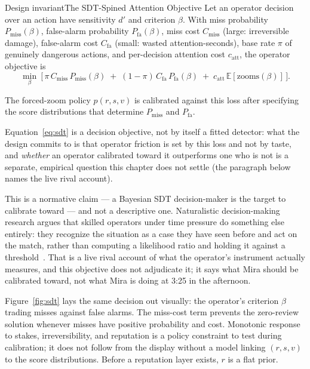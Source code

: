 \documentclass[11pt,a4paper]{article}
\theoremstyle{definition}
\theoremstyle{plain}
\begin{document}
\begin{pdclaim}{Design invariant}{The SDT-Spined Attention Objective}
\setlength{\parskip}{4pt plus 1pt}
\label{def:sdt}
Let an operator decision over an action have sensitivity $d'$ and criterion $\beta$.
With miss probability $P_{\text{miss}}(\beta)$, false-alarm probability
$P_{\text{fa}}(\beta)$, miss cost $C_{\text{miss}}$ (large: irreversible damage),
false-alarm cost $C_{\text{fa}}$ (small: wasted attention-seconds), base rate $\pi$
of genuinely dangerous actions, and per-decision attention cost $c_{\mathrm{att}}$, the operator
objective is
\begin{equation}\label{eq:sdt}
\min_{\beta}\ \Big[\, \pi\,C_{\text{miss}}\,P_{\text{miss}}(\beta)
   \;+\; (1-\pi)\,C_{\text{fa}}\,P_{\text{fa}}(\beta)
   \;+\; c_{\mathrm{att}}\,\mathbb{E}[\text{zooms}(\beta)] \,\Big].
\end{equation}

The forced-zoom policy $p(r,s,v)$ is calibrated against this loss after specifying
the score distributions that determine $P_{\text{miss}}$ and $P_{\text{fa}}$.

Equation~\ref{eq:sdt} is a decision objective, not by itself a fitted detector: what
the design commits to is that operator friction is set by this loss and not by taste,
and \emph{whether} an operator calibrated toward it outperforms one who is not is a
separate, empirical question this chapter does not settle (the paragraph below names
the live rival account).
\end{pdclaim}



This is a normative claim --- a Bayesian SDT decision-maker is the target to
calibrate toward --- and not a descriptive one. Naturalistic decision-making
research argues that skilled operators under time pressure do something else
entirely: they recognize the situation as a case they have seen before and act
on the match, rather than computing a likelihood ratio and holding it against a
threshold~. That is a live rival account of what the
operator's instrument actually measures, and this objective does not adjudicate
it; it says what Mira should be calibrated toward, not what Mira is doing at
3:25 in the afternoon.

Figure~\ref{fig:sdt} lays the same decision out visually: the operator's criterion
$\beta$ trading misses against false alarms. The miss-cost term prevents the
zero-review solution whenever misses have positive
probability and cost. Monotonic response to stakes, irreversibility, and reputation
is a policy constraint to test during calibration; it does not follow from the
display without a model linking $(r,s,v)$ to the score distributions. Before a
reputation layer exists, $r$ is a flat prior.
\end{document}
